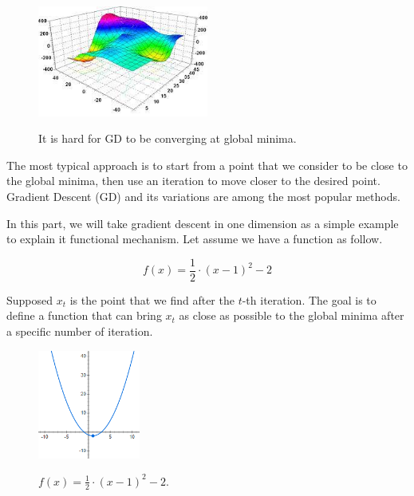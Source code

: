 	\begin{figure}[H]
		\centering
		{\includegraphics[width=0.5\textwidth]{./hinhanh/chap3/flutuate_plate.jpg}}
		\caption{It is hard for GD to be converging at global minima.}
	\end{figure}
	
	
	The most typical approach is to start from a point that we consider to be close to the global minima, then use an iteration to move closer to the desired point. Gradient Descent (GD) and its variations are among the most popular methods.
	
	In this part, we will take gradient descent in one dimension as a simple example to explain it functional mechanism. Let assume we have a function as follow.
	
	\[f(x) = \frac{1}{2} \cdot (x - 1)^2 -2\]
	
	Supposed $x_t$ is the point that we find after the $t$-th iteration. The goal is to define a function that can bring $x_t$ as close as possible to the global minima after a specific number of iteration.
	
	\begin{figure}[H]
		\centering
		{\includegraphics[width=0.3\textwidth]{./hinhanh/chap3/simple_f(x).png}}
		\caption{$ f(x) = \frac{1}{2} \cdot (x - 1)^2 -2 $.}
	\end{figure}
	
